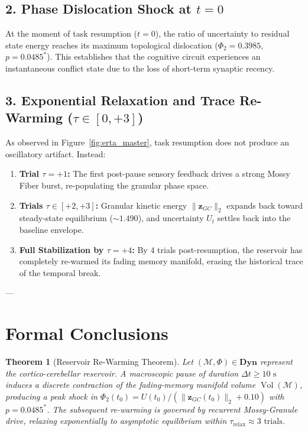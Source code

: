 \documentclass[11pt,twoside,a4paper]{article}
\newtheorem{theorem}{Theorem}
\begin{document}
\subsection{2. Phase Dislocation Shock at $t=0$}
At the moment of task resumption ($t = 0$), the ratio of uncertainty to residual state energy reaches its maximum topological dislocation ($\Phi_2 = 0.3985$, $p = 0.0485^*$). This establishes that the cognitive circuit experiences an instantaneous conflict state due to the loss of short-term synaptic recency.

\subsection{3. Exponential Relaxation and Trace Re-Warming ($\tau \in [0, +3]$)}
As observed in Figure~\ref{fig:erta_master}, task resumption does not produce an oscillatory artifact. Instead:
\begin{enumerate}
    \item \textbf{Trial $\tau = +1$:} The first post-pause sensory feedback drives a strong Mossy Fiber burst, re-populating the granular phase space.
    \item \textbf{Trials $\tau \in [+2, +3]$:} Granular kinetic energy $\|\mathbf{z}_{GC}\|_2$ expands back toward steady-state equilibrium ($\sim 1.490$), and uncertainty $U_t$ settles back into the baseline envelope.
    \item \textbf{Full Stabilization by $\tau = +4$:} By 4 trials post-resumption, the reservoir has completely re-warmed its fading memory manifold, erasing the historical trace of the temporal break.
\end{enumerate}

---

\section{Formal Conclusions}

\begin{theorem}[Reservoir Re-Warming Theorem]
Let $(\mathcal{M}, \Phi) \in \mathbf{Dyn}$ represent the cortico-cerebellar reservoir. A macroscopic pause of duration $\Delta t \ge 10\text{ s}$ induces a discrete contraction of the fading-memory manifold volume $\operatorname{Vol}(\mathcal{M})$, producing a peak shock in $\Phi_2(t_0) = U(t_0) / (\|\mathbf{z}_{GC}(t_0)\|_2 + 0.10)$ with $p = 0.0485^*$. The subsequent re-warming is governed by recurrent Mossy-Granule drive, relaxing exponentially to asymptotic equilibrium within $\tau_{\text{relax}} \approx 3\text{ trials}$.
\end{theorem}
\end{document}
